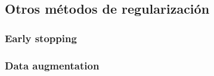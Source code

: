 \hypertarget{otros-muxe9todos-de-regularizaciuxf3n}{%
\subsection{Otros métodos de
regularización}\label{otros-muxe9todos-de-regularizaciuxf3n}}

\hypertarget{early-stopping}{%
\subsubsection{Early stopping}\label{early-stopping}}

\hypertarget{data-augmentation}{%
\subsubsection{Data augmentation}\label{data-augmentation}}
